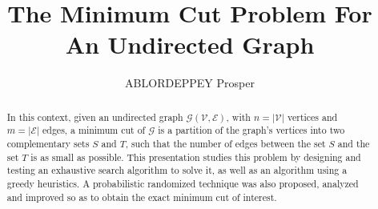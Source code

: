 \documentclass[longpaper, english, final, times]{revdetua}
\begin{document}
	
	
	\title{The Minimum Cut Problem For An Undirected Graph}
	\author{ABLORDEPPEY Prosper} %
	\maketitle
	
	\begin{abstract}%
		In this context, given an undirected graph $\mathcal{G(V, E)}$, with $n=\mathcal{|V|}$ vertices and $m=\mathcal{|E|}$ edges, a minimum cut of $\mathcal{G}$ is a partition of the graph's vertices into two complementary sets $S$ and $T$, such that the number of edges between the set $S$ and the set $T$ is as small as possible.
		This presentation studies this problem by designing and testing an exhaustive search algorithm to solve it, as well as an algorithm using a greedy heuristics. A probabilistic randomized technique was also proposed, analyzed and improved so as to obtain the exact minimum cut of interest.
	\end{abstract}
	
	
	
\end{document}
